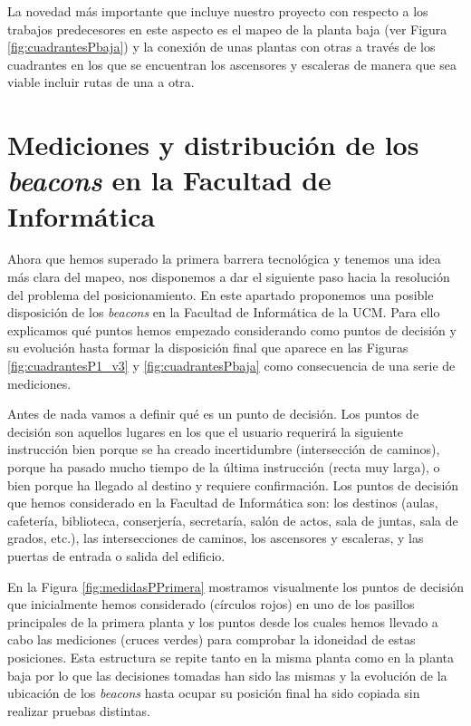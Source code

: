 La novedad más importante que incluye nuestro proyecto con respecto a los trabajos predecesores en este aspecto es el mapeo de la planta baja (ver Figura \ref{fig:cuadrantesPbaja}) y la conexión de unas plantas con otras a través de los cuadrantes en los que se encuentran los ascensores y escaleras de manera que sea viable incluir rutas de una a otra.



\section{Mediciones y distribución de los \textit{beacons} en la Facultad de Informática}
\label{sec:medicionesbeacons}

Ahora que hemos superado la primera barrera tecnológica y tenemos una idea más clara del mapeo, nos disponemos a dar el siguiente paso hacia la resolución del problema del posicionamiento. En este apartado proponemos una posible disposición de los \textit{beacons} en la Facultad de Informática de la UCM. Para ello explicamos qué puntos hemos empezado considerando como puntos de decisión y su evolución hasta formar la disposición final que aparece en las Figuras \ref{fig:cuadrantesP1_v3} y \ref{fig:cuadrantesPbaja} como consecuencia de una serie de mediciones.

Antes de nada vamos a definir qué es un punto de decisión. Los puntos de decisión son aquellos lugares en los que el usuario requerirá la siguiente instrucción bien porque se ha creado incertidumbre (intersección de caminos), porque ha pasado mucho tiempo de la última instrucción (recta muy larga), o bien porque ha llegado al destino y requiere confirmación. Los puntos de decisión que hemos considerado en la Facultad de Informática son: los destinos (aulas, cafetería, biblioteca, conserjería, secretaría, salón de actos, sala de juntas, sala de grados, etc.), las intersecciones de caminos, los ascensores y escaleras, y las puertas de entrada o salida del edificio.

En la Figura \ref{fig:medidasPPrimera} mostramos visualmente los puntos de decisión que inicialmente hemos considerado (círculos rojos) en uno de los pasillos principales de la primera planta y los puntos desde los cuales hemos llevado a cabo las mediciones (cruces verdes) para comprobar la idoneidad de estas posiciones. Esta estructura se repite tanto en la misma planta como en la planta baja por lo que las decisiones tomadas han sido las mismas y la evolución de la ubicación de los \textit{beacons} hasta ocupar su posición final ha sido copiada sin realizar pruebas distintas.

